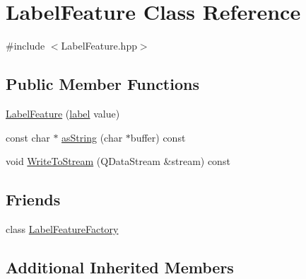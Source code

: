 \hypertarget{class_label_feature}{\section{Label\+Feature Class Reference}
\label{class_label_feature}
}


{\ttfamily \#include $<$Label\+Feature.\+hpp$>$}

\subsection*{Public Member Functions}
\begin{DoxyCompactItemize}
\item 
\hyperlink{class_label_feature_a21dbb00cb69ffea2ee565ead8801266a}{Label\+Feature} (\hyperlink{_label_feature_8hpp_a331f639078ba664b292b59c4032245e1}{label} value)
\item 
const char $\ast$ \hyperlink{class_label_feature_acad3108c7016d5d82ffea0b07ac9911e}{as\+String} (char $\ast$buffer) const 
\item 
void \hyperlink{class_label_feature_a2c30c826c770d0c5892b99bea90010f1}{Write\+To\+Stream} (Q\+Data\+Stream \&stream) const 
\end{DoxyCompactItemize}
\subsection*{Friends}
\begin{DoxyCompactItemize}
\item 
class \hyperlink{class_label_feature_a9675cfb38157a70cecfa458743f39dd1}{Label\+Feature\+Factory}
\end{DoxyCompactItemize}
\subsection*{Additional Inherited Members}


